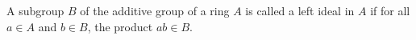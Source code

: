 A subgroup $B$ of the additive group of a ring $A$ is called a left ideal in $A$ if for all $a \in A$ and $b \in B$, the product $ab \in B$.